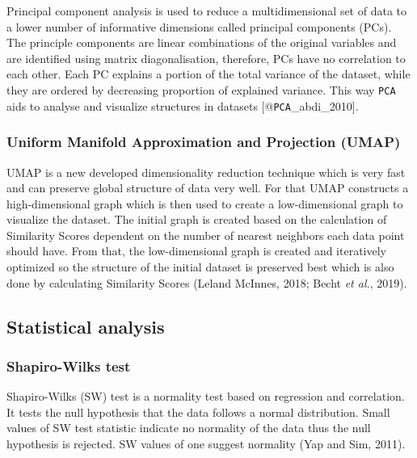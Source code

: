\documentclass[
  parskip,
  oneside]{scrreprt}
\begin{document}
Principal component analysis is used to reduce a multidimensional set of
data to a lower number of informative dimensions called principal
components (PCs). The principle components are linear combinations of
the original variables and are identified using matrix diagonalisation,
therefore, PCs have no correlation to each other. Each PC explains a
portion of the total variance of the dataset, while they are ordered by
decreasing proportion of explained variance. This way \texttt{PCA} aids
to analyse and visualize structures in datasets
{[}@\texttt{PCA}\_abdi\_2010{]}.

\hypertarget{uniform-manifold-approximation-and-projection-umap}{%
\subsubsection{Uniform Manifold Approximation and Projection
(UMAP)}\label{uniform-manifold-approximation-and-projection-umap}}

UMAP is a new developed dimensionality reduction technique which is very
fast and can preserve global structure of data very well. For that UMAP
constructs a high-dimensional graph which is then used to create a
low-dimensional graph to visualize the dataset. The initial graph is
created based on the calculation of Similarity Scores dependent on the
number of nearest neighbors each data point should have. From that, the
low-dimensional graph is created and iteratively optimized so the
structure of the initial dataset is preserved best which is also done by
calculating Similarity Scores (Leland McInnes, 2018; Becht \emph{et
al.}, 2019).

\hypertarget{statistical-analysis}{%
\subsection{Statistical analysis}\label{statistical-analysis}}

\hypertarget{shapiro-wilks-test}{%
\subsubsection{Shapiro-Wilks test}\label{shapiro-wilks-test}}

Shapiro-Wilks (SW) test is a normality test based on regression and
correlation. It tests the null hypothesis that the data follows a normal
distribution. Small values of SW test statistic indicate no normality of
the data thus the null hypothesis is rejected. SW values of one suggest
normality (Yap and Sim, 2011).
\end{document}
